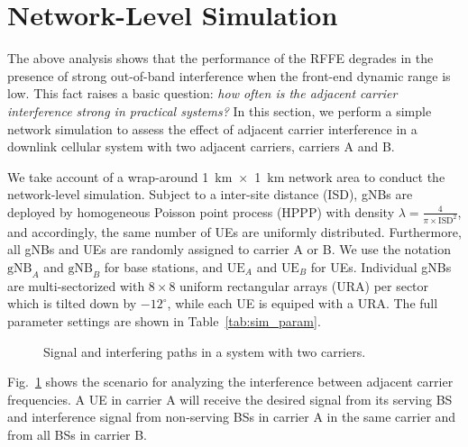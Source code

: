 \section{Network-Level Simulation} \label{sec:network}
The above analysis shows that the performance of the RFFE
degrades in the presence of strong out-of-band
interference when the front-end dynamic range is low.
This fact raises a basic question:  \emph{how often
is the adjacent carrier interference strong in practical 
systems?}  In this section, we perform a simple network simulation
to assess the effect of adjacent carrier interference in 
a downlink cellular system with two 
adjacent carriers, carriers A and B.

We take account of a wrap-around \SI{1}{km}~$\times$~\SI{1}{km} network area to conduct the network-level simulation. Subject to a inter-site distance (ISD), gNBs are deployed by homogeneous Poisson point process (HPPP) with density $\lambda = \frac{4}{\pi\times\text{ISD}^2}$, and accordingly, the same number of UEs are uniformly distributed. Furthermore, all gNBs and UEs are 
randomly assigned to carrier A or B.
We use the notation $\text{gNB}_{A}$ and $\text{gNB}_{B}$ for base stations, and  $\text{UE}_{A}$ and $\text{UE}_{B}$ for UEs.
Individual gNBs are multi-sectorized with $8\times8$ uniform rectangular arrays (URA) per sector which is tilted down by $-12^\circ$, while each UE is equiped with a URA. The full 
parameter settings are shown in Table~\ref{tab:sim_param}. 

\begin{figure}[t]
    \centering
    
    \caption{Signal and interfering
    paths in a system with two carriers.}
    \label{fig:network}
\end{figure}

Fig.~\ref{fig:network} shows the scenario for analyzing the interference between adjacent carrier frequencies. A UE in carrier A 
will receive the desired signal from its serving BS and interference signal from non-serving
BSs in
carrier A in the same carrier and
from all BSs in carrier B.

